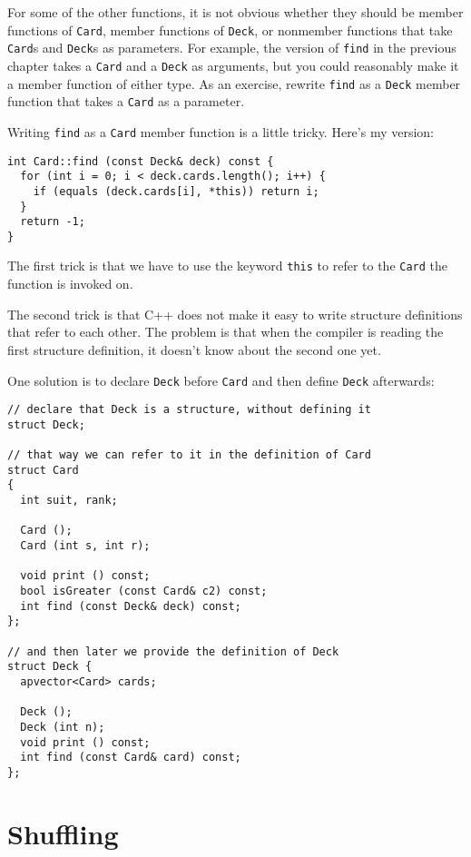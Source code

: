For some of the other functions, it is not obvious whether they should
be member functions of {\tt Card}, member functions of {\tt Deck}, or
nonmember functions that take {\tt Card}s and {\tt Deck}s as parameters.
For example, the version of {\tt find} in the previous chapter
takes a {\tt Card} and a {\tt Deck} as arguments, but you could
reasonably make it a member function of either type.  As an exercise,
rewrite {\tt find} as a {\tt Deck} member function that takes
a {\tt Card} as a parameter.

Writing {\tt find} as a {\tt Card} member
function is a little tricky.  Here's my version:

\begin{verbatim}
int Card::find (const Deck& deck) const {
  for (int i = 0; i < deck.cards.length(); i++) {
    if (equals (deck.cards[i], *this)) return i;
  }
  return -1;
}
\end{verbatim}
%
The first trick is that we have to use the keyword {\tt this}
to refer to the {\tt Card} the function is invoked on.


The second trick is that C++ does not make it easy to write
structure definitions that refer to each other.  The problem
is that when the compiler is reading the first structure
definition, it doesn't know about the second one yet.

One solution is to declare {\tt Deck} before {\tt Card} and
then define {\tt Deck} afterwards:

\begin{verbatim}
// declare that Deck is a structure, without defining it
struct Deck;

// that way we can refer to it in the definition of Card
struct Card
{
  int suit, rank;

  Card ();
  Card (int s, int r);

  void print () const;
  bool isGreater (const Card& c2) const;
  int find (const Deck& deck) const;
};

// and then later we provide the definition of Deck
struct Deck {
  apvector<Card> cards;

  Deck ();
  Deck (int n);
  void print () const;
  int find (const Card& card) const;
};
\end{verbatim}


\section{Shuffling}
\label{shuffle}

